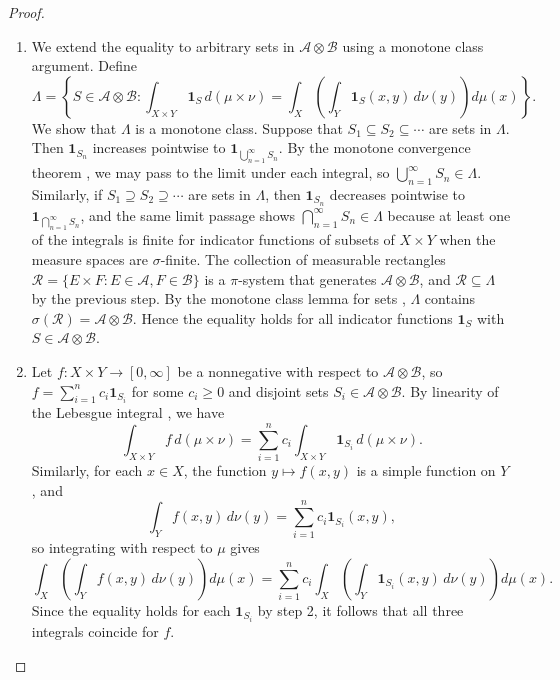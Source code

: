 \begin{proof}
\begin{enumerate}
    \item We extend the equality to arbitrary sets in $\mathcal{A} \otimes \mathcal{B}$ using a monotone class argument. Define
    $$\Lambda = \left\{ S \in \mathcal{A} \otimes \mathcal{B} : \int_{X \times Y} \mathbf{1}_S\,d(\mu \times \nu) = \int_X \left(\int_Y \mathbf{1}_S(x,y)\,d\nu(y)\right) d\mu(x) \right\}.$$
    We show that $\Lambda$ is a monotone class. Suppose that $S_1 \subseteq S_2 \subseteq \cdots$ are sets in $\Lambda$. Then $\mathbf{1}_{S_n}$ increases pointwise to $\mathbf{1}_{\bigcup_{n=1}^\infty S_n}$. By the monotone convergence theorem , we may pass to the limit under each integral, so $\bigcup_{n=1}^\infty S_n \in \Lambda$. Similarly, if $S_1 \supseteq S_2 \supseteq \cdots$ are sets in $\Lambda$, then $\mathbf{1}_{S_n}$ decreases pointwise to $\mathbf{1}_{\bigcap_{n=1}^\infty S_n}$, and the same limit passage shows $\bigcap_{n=1}^\infty S_n \in \Lambda$ because at least one of the integrals is finite for indicator functions of subsets of $X \times Y$ when the measure spaces are $\sigma$-finite. The collection of measurable rectangles $\mathcal{R} = \{E \times F : E \in \mathcal{A}, F \in \mathcal{B}\}$ is a $\pi$-system that generates $\mathcal{A} \otimes \mathcal{B}$, and $\mathcal{R} \subseteq \Lambda$ by the previous step. By the monotone class lemma for sets , $\Lambda$ contains $\sigma(\mathcal{R}) = \mathcal{A} \otimes \mathcal{B}$. Hence the equality holds for all indicator functions $\mathbf{1}_S$ with $S \in \mathcal{A} \otimes \mathcal{B}$.

    \item Let $f : X \times Y \to [0,\infty]$ be a nonnegative  with respect to $\mathcal{A} \otimes \mathcal{B}$, so $f = \sum_{i=1}^n c_i \mathbf{1}_{S_i}$ for some $c_i \geq 0$ and disjoint sets $S_i \in \mathcal{A} \otimes \mathcal{B}$. By linearity of the Lebesgue integral , we have
    $$\int_{X \times Y} f\,d(\mu \times \nu) = \sum_{i=1}^n c_i \int_{X \times Y} \mathbf{1}_{S_i}\,d(\mu \times \nu).$$
    Similarly, for each $x \in X$, the function $y \mapsto f(x,y)$ is a simple function on $Y$, and
    $$\int_Y f(x,y)\,d\nu(y) = \sum_{i=1}^n c_i \mathbf{1}_{S_i}(x,y),$$
    so integrating with respect to $\mu$ gives
    $$\int_X \left(\int_Y f(x,y)\,d\nu(y)\right) d\mu(x) = \sum_{i=1}^n c_i \int_X \left(\int_Y \mathbf{1}_{S_i}(x,y)\,d\nu(y)\right) d\mu(x).$$
    Since the equality holds for each $\mathbf{1}_{S_i}$ by step 2, it follows that all three integrals coincide for $f$.


\end{enumerate}
\end{proof}
